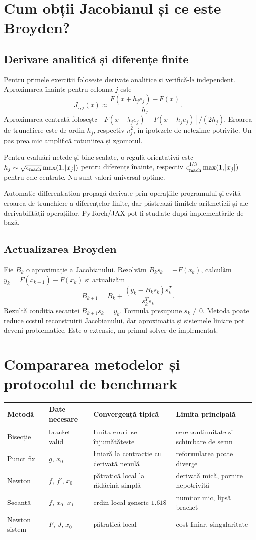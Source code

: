 \documentclass[11pt,a4paper]{article}
\begin{document}
\section{Cum obții Jacobianul și ce este Broyden?}
\subsection{Derivare analitică și diferențe finite}
Pentru primele exerciții folosește derivate analitice și verifică-le independent. Aproximarea înainte pentru coloana $j$ este
\[
J_{:,j}(x)\approx\frac{F(x+h_je_j)-F(x)}{h_j}.
\]
Aproximarea centrată folosește $[F(x+h_je_j)-F(x-h_je_j)]/(2h_j)$. Eroarea de trunchiere este de ordin $h_j$, respectiv $h_j^2$, în ipotezele de netezime potrivite. Un pas prea mic amplifică rotunjirea și zgomotul.

Pentru evaluări netede și bine scalate, o regulă orientativă este $h_j\sim\sqrt{\epsilon_{\rm mach}}\max(1,|x_j|)$ pentru diferențe înainte, respectiv $\epsilon_{\rm mach}^{1/3}\max(1,|x_j|)$ pentru cele centrate. Nu sunt valori universal optime.

Automatic differentiation propagă derivate prin operațiile programului și evită eroarea de trunchiere a diferențelor finite, dar păstrează limitele aritmeticii și ale derivabilității operațiilor. PyTorch/JAX pot fi studiate după implementările de bază.

\subsection{Actualizarea Broyden}
Fie $B_k$ o aproximație a Jacobianului. Rezolvăm $B_ks_k=-F(x_k)$, calculăm $y_k=F(x_{k+1})-F(x_k)$ și actualizăm
\[
B_{k+1}=B_k+\frac{(y_k-B_ks_k)s_k^T}{s_k^Ts_k}.
\]
Rezultă condiția secantei $B_{k+1}s_k=y_k$. Formula presupune $s_k\ne0$. Metoda poate reduce costul reconstruirii Jacobianului, dar aproximația și sistemele liniare pot deveni problematice. Este o extensie, nu primul solver de implementat.

\section{Compararea metodelor și protocolul de benchmark}
\begin{center}\small
\begin{tabular}{p{21mm}p{29mm}p{25mm}p{52mm}}\toprule
Metodă & Date necesare & Convergență tipică & Limita principală\\\midrule
Bisecție & bracket valid & limita erorii se înjumătățește & cere continuitate și schimbare de semn\\
Punct fix & $g$, $x_0$ & liniară la contracție cu derivată nenulă & reformularea poate diverge\\
Newton & $f$, $f'$, $x_0$ & pătratică local la rădăcină simplă & derivată mică, pornire nepotrivită\\
Secantă & $f$, $x_0$, $x_1$ & ordin local generic $1.618$ & numitor mic, lipsă bracket\\
Newton sistem & $F$, $J$, $x_0$ & pătratică local & cost liniar, singularitate\\\bottomrule
\end{tabular}
\end{center}
\end{document}
